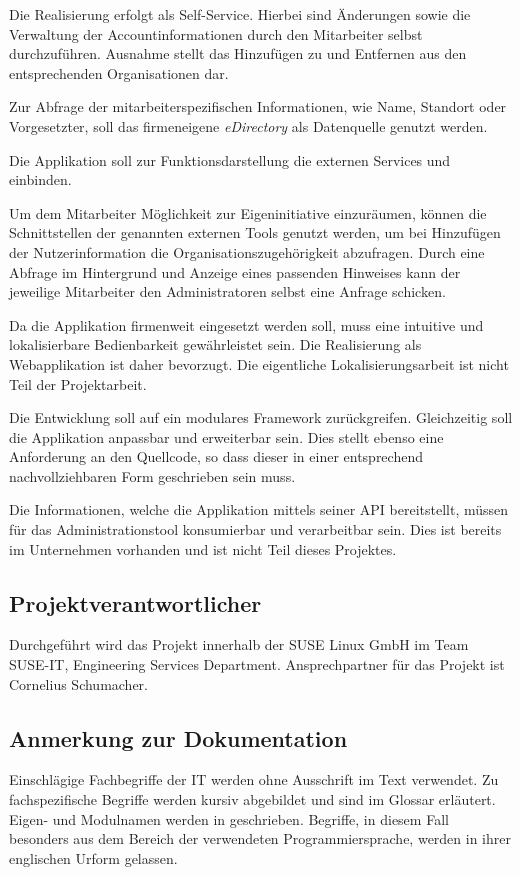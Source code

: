 Die Realisierung erfolgt als Self-Service. Hierbei sind Änderungen sowie die Verwaltung
der Accountinformationen durch den Mitarbeiter selbst durchzuführen. Ausnahme stellt das Hinzufügen
zu und Entfernen aus den entsprechenden Organisationen dar.

Zur Abfrage der mitarbeiterspezifischen Informationen, wie Name, Standort oder Vorgesetzter, soll
das firmeneigene \textit{eDirectory} als Datenquelle genutzt werden.

Die Applikation soll zur Funktionsdarstellung die externen Services  und  einbinden.

Um dem Mitarbeiter Möglichkeit zur Eigeninitiative einzuräumen, können die Schnittstellen der
genannten externen Tools genutzt werden, um bei Hinzufügen der Nutzerinformation
die Organisationszugehörigkeit abzufragen. Durch eine Abfrage im Hintergrund und Anzeige eines
passenden Hinweises kann der jeweilige Mitarbeiter den Administratoren selbst eine Anfrage schicken.

Da die Applikation firmenweit eingesetzt werden soll, muss eine intuitive und lokalisierbare
Bedienbarkeit gewährleistet sein. Die Realisierung als Webapplikation ist daher bevorzugt.
Die eigentliche Lokalisierungsarbeit ist nicht Teil der Projektarbeit.

Die Entwicklung soll auf ein modulares Framework zurückgreifen. Gleichzeitig soll die Applikation
anpassbar und erweiterbar sein. Dies stellt ebenso eine Anforderung an den Quellcode, so dass dieser
in einer entsprechend nachvollziehbaren Form geschrieben sein muss.

Die Informationen, welche die Applikation mittels seiner API bereitstellt, müssen für das Administrationstool
 konsumierbar und verarbeitbar sein. Dies ist bereits im Unternehmen vorhanden und
ist nicht Teil dieses Projektes.

\subsection{Projektverantwortlicher}
\label{sec:Projektverantwortlicher}
Durchgeführt wird das Projekt innerhalb der SUSE Linux GmbH im Team SUSE-IT, Engineering Services
Department. Ansprechpartner für das Projekt ist Cornelius Schumacher.

\subsection{Anmerkung zur Dokumentation}
\label{sec:Anmerkung zur Dokumentation}
Einschlägige Fachbegriffe der IT werden ohne Ausschrift im Text verwendet. Zu fachspezifische
Begriffe werden kursiv abgebildet und sind im Glossar erläutert. Eigen- und Modulnamen werden in
\anf{ } geschrieben. Begriffe, in diesem Fall besonders aus dem Bereich der verwendeten Programmiersprache,
werden in ihrer englischen Urform gelassen.
\pagebreak
